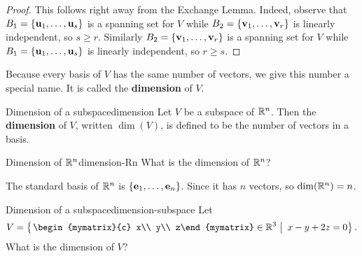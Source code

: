 \begin{proof}
  This follows right away from the Exchange Lemma. Indeed, observe
  that $B_1 = \left\{ \mbox{\bf u}_{1},\ldots ,\mbox{\bf u}_{s}\right\} $ is a spanning
  set for $V$ while $ B_2 = \left\{\mbox{\bf v}_{1},\ldots ,\mbox{\bf v}_{r}\right\} $
  is linearly independent, so $s \geq r$. Similarly
  $B_2 = \left\{\mbox{\bf v}_{1},\ldots ,\mbox{\bf v} _{r}\right\} $ is a spanning set
  for $V$ while $B_1 = \left\{\mbox{\bf u}_{1},\ldots , \mbox{\bf u}_{s}\right\} $ is
  linearly independent, so $r\geq s$.
\end{proof}

Because every basis of $V$ has the same number of vectors, we give
this number a special name. It is called the \textbf{dimension} of
$V$.

\begin{definition}{Dimension of a subspace}{dimension}
  Let $V$ be a subspace of\/ $\mathbb{R}^{n}$. Then the \textbf{dimension}%
   of $V$, written $\dim(V)$, is
  defined to be the number of vectors in a basis.
\end{definition}

\begin{example}{Dimension of\/ $\mathbb{R}^n$}{dimension-Rn}
  What is the dimension of $\mathbb{R}^{n}$?
\end{example}

\begin{solution}
  The standard basis of $\mathbb{R}^{n}$ is
  $\left\{\mbox{\bf e}_{1},\ldots,\mbox{\bf e}_{n}\right\}$. Since it has $n$ vectors,
  so $\dim(\mathbb{R}^n) = n$.
\end{solution}

\begin{example}{Dimension of a subspace}{dimension-subspace}
  Let 
  \begin{equation*}
    V=\set{\left.
      \begin{mymatrix}{c} x\\ y\\ z\end{mymatrix}\in\R^3 ~\right\vert~
      x-y+2z = 0
    }.
  \end{equation*}
  What is the dimension of\/ $V$?
\end{example}

